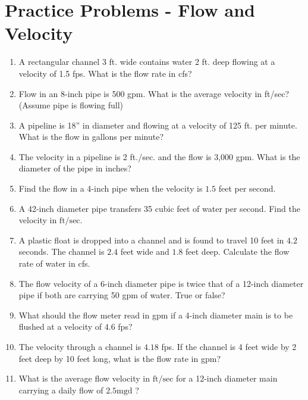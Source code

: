 \section*{Practice Problems - Flow and Velocity}
\begin{enumerate}

\item A rectangular channel 3 ft. wide contains water 2 ft. deep flowing at a velocity of 1.5 fps.
What is the flow rate in cfs?

\item Flow in an 8-inch pipe is 500 gpm. What is the average velocity in ft/sec? (Assume pipe is flowing full)

\item A pipeline is 18” in diameter and flowing at a velocity of 125 ft. per minute. What is the flow in gallons per minute?

\item The velocity in a pipeline is 2 ft./sec. and the flow is 3,000 gpm. What is the diameter of the pipe in inches?



\item Find the flow in a 4-inch pipe when the velocity is $1.5$ feet per second.

  \item A 42-inch diameter pipe transfers 35 cubic feet of water per second. Find the velocity in $\mathrm{ft} / \mathrm{sec}$. 
  
  \item A plastic float is dropped into a channel and is found to travel 10 feet in $4.2$ seconds. The channel is $2.4$ feet wide and $1.8$ feet deep. Calculate the flow rate of water in cfs.

  \item The flow velocity of a 6-inch diameter pipe is twice that of a 12-inch diameter pipe if both are carrying 50 gpm of water. True or false?

  \item What should the flow meter read in gpm if a 4-inch diameter main is to be flushed at a velocity of $4.6$ fps?

  \item The velocity through a channel is $4.18$ fps. If the channel is 4 feet wide by 2 feet deep by 10 feet long, what is the flow rate in gpm?

  \item What is the average flow velocity in $\mathrm{ft} / \mathrm{sec}$ for a 12-inch diameter main carrying a daily flow of $2.5 \mathrm{mgd}$ ?

\end{enumerate}




